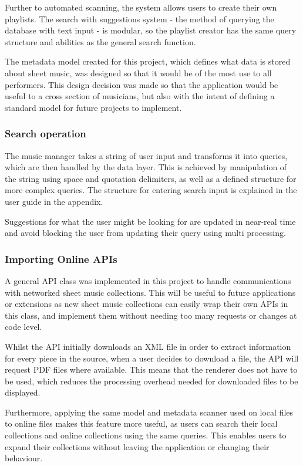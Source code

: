 Further to automated scanning, the system allows users to create their own playlists. The search with suggestions system - the method of querying the database with text input - is modular, so the playlist creator has the same query structure and abilities as the general search function.

The metadata model created for this project, which defines what data is stored about sheet music, was designed so that it would be of the most use to all performers. This design decision was made so that the application would be useful to a cross section of musicians, but also with the intent of defining a standard model for future projects to implement.

\subsubsection{Search operation}
The music manager takes a string of user input and transforms it into queries, which are then handled by the data layer. This is achieved by manipulation of the string using space and quotation delimiters, as well as a defined structure for more complex queries. The structure for entering search input is explained in the user guide in the appendix.

Suggestions for what the user might be looking for are updated in near-real time and avoid blocking the user from updating their query using multi processing.

\subsubsection{Importing Online APIs}
A general API class was implemented in this project to handle communications with networked sheet music collections. This will be useful to future applications or extensions as new sheet music collections can easily wrap their own APIs in this class, and implement them without needing too many requests or changes at code level.

Whilst the API initially downloads an XML file in order to extract information for every piece in the source, when a user decides to download a file, the API will request PDF files where available. This means that the renderer does not have to be used, which reduces the processing overhead needed for downloaded files to be displayed.

Furthermore, applying the same model and metadata scanner used on local files to online files makes this feature more useful, as users can search their local collections and online collections using the same queries. This enables users to expand their collections without leaving the application or changing their behaviour.

